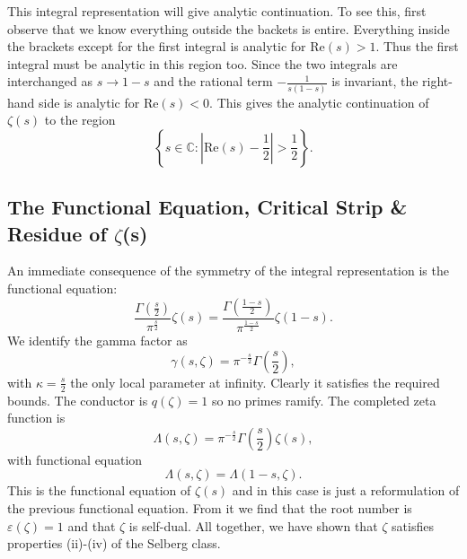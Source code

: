 \documentclass[12pt]{book}
\theoremstyle{definition}\newframedtheorem{method}{Method}
\newcommand{\C}{\mathbb{C}}
\newcommand{\g}{\gamma}
\newcommand{\z}{\zeta}
\renewcommand{\k}{\kappa}
\newcommand{\G}{\Gamma}
\renewcommand{\L}{\Lambda}
\newcommand{\e}{\varepsilon}
\newcommand{\<}{\langle}
\renewcommand{\>}{\rangle}
\renewcommand{\Re}{\mathrm{Re}}
\begin{document}
      This integral representation will give analytic continuation. To see this, first observe that we know everything outside the backets is entire. Everything inside the brackets except for the first integral is analytic for $\Re(s) > 1$. Thus the first integral must be analytic in this region too. Since the two integrals are interchanged as $s \to 1-s$ and the rational term $-\frac{1}{s(1-s)}$ is invariant, the right-hand side is analytic for $\Re(s) < 0$. This gives the analytic continuation of $\z(s)$ to the region
      \[
        \left\{s \in \C:\left|\Re(s)-\frac{1}{2}\right| > \frac{1}{2}\right\}.
      \]
    \subsection*{The Functional Equation, Critical Strip \& Residue of \texorpdfstring{$\z$}{z}(s)}
      An immediate consequence of the symmetry of the integral representation is the functional equation:
      \[
        \frac{\G\left(\frac{s}{2}\right)}{\pi^{\frac{s}{2}}}\z(s) = \frac{\G\left(\frac{1-s}{2}\right)}{\pi^{\frac{1-s}{2}}}\z(1-s).
      \]
      We identify the gamma factor as
      \[
        \g(s,\z) = \pi^{-\frac{s}{2}}\G\left(\frac{s}{2}\right),
      \]
      with $\k = \frac{s}{2}$ the only local parameter at infinity. Clearly it satisfies the required bounds. The conductor is $q(\z) = 1$ so no primes ramify. The completed zeta function is
      \[
        \L(s,\z) = \pi^{-\frac{s}{2}}\G\left(\frac{s}{2}\right)\z(s),
      \]
      with functional equation
      \[
        \L(s,\z) = \L(1-s,\z).
      \]
      This is the functional equation of $\z(s)$ and in this case is just a reformulation of the previous functional equation. From it we find that the root number is $\e(\z) = 1$ and that $\z$ is self-dual. All together, we have shown that $\z$ satisfies properties (ii)-(iv) of the Selberg class.
\end{document}
